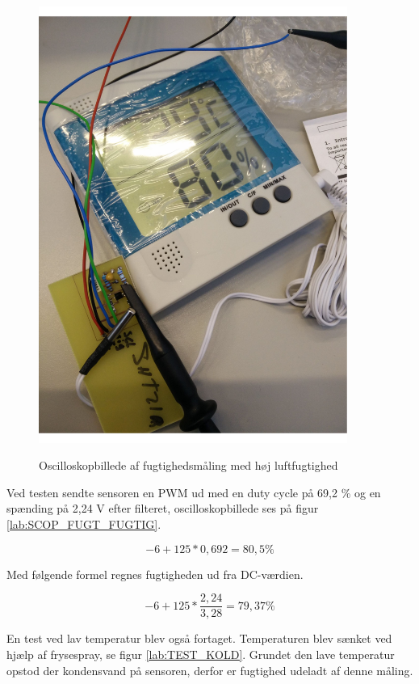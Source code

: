 \begin{figure}[H]
\centering
{\includegraphics[width=0.90\textwidth]{filer/modultest/Billeder/test_FUGTIG}}
\caption{Oscilloskopbillede af fugtighedsmåling med høj luftfugtighed}
\label{lab:TEST_FUGTIG}
\end{figure}


Ved testen sendte sensoren en PWM ud med en duty cycle på 69,2 \% og en spænding på 2,24 V efter filteret, oscilloskopbillede ses på figur \ref{lab:SCOP_FUGT_FUGTIG}.


\begin{equation}
-6+125*0,692= 80,5\%
\end{equation}

Med følgende formel regnes fugtigheden ud fra DC-værdien.

\begin{equation}
-6+125*\frac{2,24}{3,28}= 79,37\%
\end{equation}


En test ved lav temperatur blev også fortaget. Temperaturen blev sænket ved hjælp af frysespray, se figur \ref{lab:TEST_KOLD}. Grundet den lave temperatur opstod der kondensvand på sensoren, derfor er fugtighed udeladt af denne måling.


